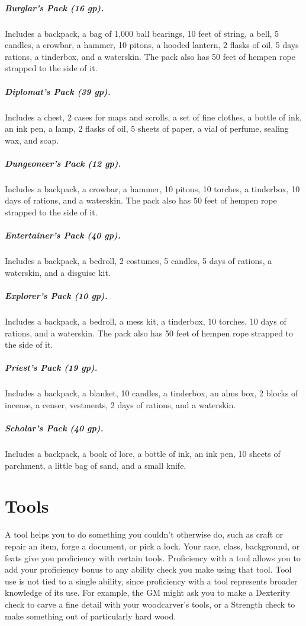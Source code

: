 \subparagraph*{Burglar's Pack (16 gp).} Includes a backpack, a bag of 1,000 ball bearings, 10 feet of string, a bell, 5 candles, a crowbar, a hammer, 10 pitons, a hooded lantern, 2 flasks of oil, 5 days rations, a tinderbox, and a waterskin. The pack also has 50 feet of hempen rope strapped to the side of it.

\subparagraph*{Diplomat's Pack (39 gp).} Includes a chest, 2 cases for maps and scrolls, a set of fine clothes, a bottle of ink, an ink pen, a lamp, 2 flasks of oil, 5 sheets of paper, a vial of perfume, sealing wax, and soap.

\subparagraph*{Dungeoneer's Pack (12 gp).} Includes a backpack, a crowbar, a hammer, 10 pitons, 10 torches, a tinderbox, 10 days of rations, and a waterskin. The pack also has 50 feet of hempen rope strapped to the side of it.

\subparagraph*{Entertainer's Pack (40 gp).} Includes a backpack, a bedroll, 2 costumes, 5 candles, 5 days of rations, a waterskin, and a disguise kit.

\subparagraph*{Explorer's Pack (10 gp).} Includes a backpack, a bedroll, a mess kit, a tinderbox, 10 torches, 10 days of rations, and a waterskin. The pack also has 50 feet of hempen rope strapped to the side of it.

\subparagraph*{Priest's Pack (19 gp).} Includes a backpack, a blanket, 10 candles, a tinderbox, an alms box, 2 blocks of incense, a censer, vestments, 2 days of rations, and a waterskin.

\subparagraph*{Scholar's Pack (40 gp).} Includes a backpack, a book of lore, a bottle of ink, an ink pen, 10 sheets of parchment, a little bag of sand, and a small knife.

\section{Tools}

A tool helps you to do something you couldn't otherwise do, such as craft or repair an item, forge a document, or pick a lock. Your race, class, background, or feats give you proficiency with certain tools. Proficiency with a tool allows you to add your proficiency bonus to any ability check you make using that tool. Tool use is not tied to a single ability, since proficiency with a tool represents broader knowledge of its use. For example, the GM might ask you to make a Dexterity check to carve a fine detail with your woodcarver's tools, or a Strength check to make something out of particularly hard wood.

